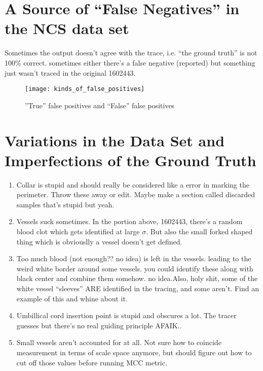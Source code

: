 \section{A Source of ``False Negatives'' in the NCS data set} \label{sec:NCS-dataset-issues}

Sometimes the output doesn't agree with the trace, i.e. ``the ground truth'' is not 100\% correct.
sometimes either there's a false negative (reported) but something just wasn't traced in the original  1602443.

\begin{figure} \centering
	\texttt{[image: kinds\_of\_false\_positives]}
	\caption{''True'' false positives and ``False'' false positives}
\end{figure}

\section{Variations in the Data Set and Imperfections of the Ground Truth}

\begin{enumerate}
\item Collar is stupid and should really be considered like a error in marking the perimeter. Throw these away or edit. Maybe make a section called discarded samples that's stupid but yeah.
\item Vessels suck sometimes. In the portion above, 1602443, there's a random blood clot which gets identified at large $\sigma$. But also the small forked shaped thing which is obviouslly a vessel doesn't get defined.
\item Too much blood (not enough?? no idea) is left in the vessels. leading to the weird white border around some vessels. you could identify these along with black center and combine them somehow. no idea.Also, holy shit, some of the white vessel ``sleeves'' ARE identified in the tracing, and some aren't. Find an example of this and whine about it.
\item Umbillical cord insertion point is stupid and obscures a lot. The tracer guesses but there's no real guiding principle AFAIK..
\item Small vessels aren't accounted for at all. Not sure how to coincide measurement in terms of scale space anymore, but should figure out how to cut off those values before running MCC metric.
\end{enumerate}





